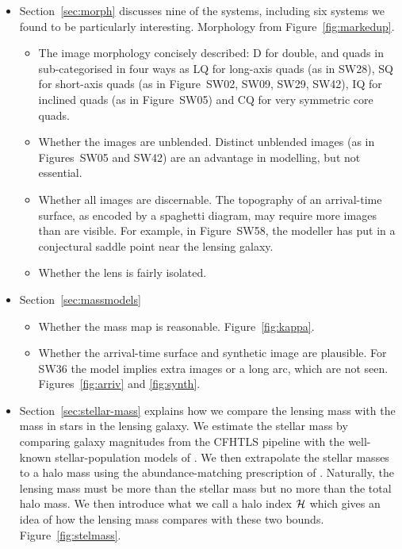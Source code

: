 \begin{itemize}
\item Section~\ref{sec:morph} discusses nine of the systems, including
  six systems we found to be particularly interesting.  Morphology
  from Figure~\ref{fig:markedup}.
\begin{itemize}
\item The image morphology concisely described: D for double, and
  quads in sub-categorised in four ways
  \citep[cf.][]{2003AJ....125.2769S} as LQ for long-axis quads (as in
  SW28), SQ for short-axis quads (as in Figure~SW02,
  SW09, SW29, SW42), IQ for inclined quads
  (as in Figure~SW05) and CQ for very symmetric core quads.
\item Whether the images are unblended.  Distinct unblended images (as
  in Figures~SW05 and SW42) are an advantage in
  modelling, but not essential.
\item Whether all images are discernable.  The topography of an
  arrival-time surface, as encoded by a spaghetti diagram, may require
  more images than are visible.  For example, in Figure~SW58,
  the modeller has put in a conjectural saddle point near the lensing
  galaxy.
\item Whether the lens is fairly isolated.
\end{itemize}
\item Section~\ref{sec:massmodels}
\begin{itemize}
\item Whether the mass map is reasonable. Figure~\ref{fig:kappa}.
\item Whether the arrival-time surface and synthetic image are
  plausible.  For SW36 the model implies extra images or a long arc,
  which are not seen.  Figures~\ref{fig:arriv} and \ref{fig:synth}.
\end{itemize}
\item Section~\ref{sec:stellar-mass} explains how we compare the lensing
mass with the mass in stars in the lensing galaxy.  We estimate the
stellar mass by comparing galaxy magnitudes from the CFHTLS pipeline
with the well-known stellar-population models of
\cite{2003MNRAS.344.1000B}.  We then extrapolate the stellar masses to
a halo mass using the abundance-matching prescription of
\cite{2010ApJ...710..903M}.  Naturally, the lensing mass must be more
than the stellar mass but no more than the total halo mass.  We then
introduce what we call a halo index $\mathcal{H}$ which gives an idea
of how the lensing mass compares with these two bounds.
Figure~\ref{fig:stelmass}.
\end{itemize}







